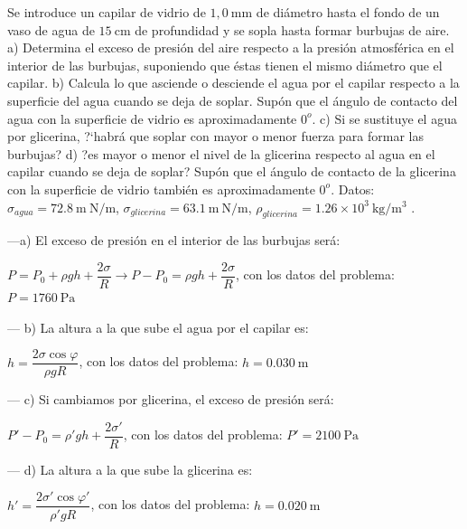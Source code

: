 \begin{prob}
\small{Se introduce un capilar de vidrio de $1,0 \ \mathrm{mm}$ de diámetro hasta el fondo de un vaso de agua de $15 \ \mathrm{cm}$ de profundidad y se sopla hasta formar burbujas de aire. a) Determina el exceso de presión del aire respecto a la presión atmosférica en el interior de las burbujas, suponiendo que éstas tienen el mismo diámetro que el capilar. b) Calcula lo que asciende o desciende el agua por el capilar respecto a la superficie del agua cuando se deja de soplar. Supón que el ángulo de contacto del agua con la superficie de vidrio es aproximadamente $0^o$. c) Si se sustituye el agua por glicerina, ?`habrá que soplar con mayor o menor fuerza para formar las burbujas? d) ?es mayor o menor el nivel de la glicerina respecto al agua en el capilar cuando se deja de soplar? Supón que el ángulo de contacto de la glicerina con la superficie de vidrio también es aproximadamente $0^o$. Datos: $\sigma_{agua}=72.8 \ \mathrm{m\ N/m}$, $\sigma_{glicerina}=63.1 \ \mathrm{m\ N/m}$, $\rho_{glicerina}=1.26  \times 10^3 \ \mathrm{kg}/\mathrm{m}^3$	}\normalsize{.}
\end{prob}


---a) El exceso de presión en el interior de las burbujas será:

$P=P_0+\rho g h + \dfrac {2\sigma}{R} \to P-P_0=\rho g h + \dfrac {2\sigma}{R}$, con los datos del problema: $P=1760\ \mathrm{Pa}$

--- b) La altura a la que sube el agua por el capilar es:

$h=\dfrac{2\sigma \cos \varphi}{\rho g R}$, con los datos del problema: $h=0.030 \ \mathrm{m}$

--- c) Si cambiamos por glicerina, el exceso de presión será:

$ P'-P_0=\rho' g h + \dfrac {2\sigma'}{R}$, con los datos del problema: $P'=2100\ \mathrm{Pa}$

--- d) La altura a la que sube la glicerina es:

$h'=\dfrac{2\sigma' \cos \varphi'}{\rho' g R}$, con los datos del problema: $h=0.020\  \mathrm{m}$

